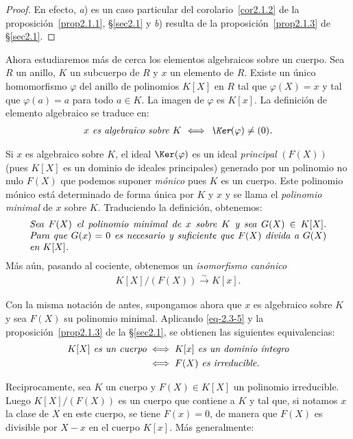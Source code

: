 \documentclass[oneside,bibtotoc,leqno,spanish]{amsbook}
\renewcommand{\to}[1][]{\xrightarrow{#1}}
\numberwithin{equation}{section}
\theoremstyle{defi}
\theoremstyle{note}
\theoremstyle{rem}
\numberwithin{theorem}{section}
\numberwithin{proposition}{section}
\numberwithin{definition}{section}
\numberwithin{lemma}{section}
\numberwithin{corollary}{section}
\numberwithin{example}{section}
\numberwithin{footnote}{section}%
\begin{document}
\begin{proof}
En efecto, {\itshape a}) es un caso particular del corolario~\ref{cor2.1.2} de la proposici\'on~\ref{prop2.1.1}, \S\ref{sec2.1}
y {\itshape b}) resulta de la proposici\'on~\ref{prop2.1.3} de \S\ref{sec2.1}.
\end{proof}

Ahora estudiaremos m\'as de cerca los elementos algebraicos sobre un cuerpo. Sea $R$ un anillo, $K$ un subcuerpo
de $R$ y $x$ un elemento de $R$. Existe un \'unico homomorfismo $\varphi$ del anillo de polinomios $K[X]$ en
$R$ tal que $\varphi(X) = x$ y tal que $\varphi(a) = a$ para todo $a\in K$. La imagen de $\varphi$ es $K[x]$.
La definici\'on de elemento algebraico se traduce en:
\begin{gather}\label{eq-2.3-4}
\text{\itshape $x$ es algebraico sobre $K$ $\iff$ $\Ker(\varphi)\neq(0)$.}
\end{gather}

Si $x$ es algebraico sobre $K$, el ideal $\Ker(\varphi)$ es un ideal {\em principal} $(F(X))$
(pues $K[X]$ es un dominio de ideales principales) generado por un polinomio no nulo $F(X)$ que podemos
suponer {\em m\'onico} pues $K$ es un cuerpo. Este polinomio m\'onico est\'a determinado de forma \'unica por
$K$ y $x$ y se llama el {\em polinomio minimal} de $x$ sobre $K$. Traduciendo la definici\'on, obtenemos:
\begin{gather}\label{eq-2.3-5}
\text{\parbox{0.9\textwidth}{\itshape Sea $F(X)$ el polinomio minimal de $x$ sobre $K$ y sea $G(X)\in K[X]$. Para que
$G(x) = 0$ es necesario y suficiente que $F(X)$ divida a $G(X)$ en $K[X]$.}}
\end{gather}
M\'as a\'un, pasando al cociente, obtenemos un {\em isomorfismo can\'onico}
\begin{gather}\label{eq-2.3-6}
K[X]/(F(X))\to[\sim] K[x].
\end{gather}

Con la misma notaci\'on de antes, supongamos ahora que $x$ es algebraico sobre $K$ y sea $F(X)$ su polinomio
minimal. Aplicando \eqref{eq-2.3-5} y la proposici\'on~\ref{prop2.1.3} de la \S\ref{sec2.1}, se obtienen las siguientes equivalencias:
\begin{align}
\text{\itshape $K[X]$ es un cuerpo} &\iff \text{\itshape $K[x]$ es un dominio \'integro}\\
&\iff \text{\itshape $F(X)$ es irreducible.}\notag
\end{align}

Reciprocamente, sea $K$ un cuerpo y $F(X)\in K[X]$ un polinomio irreducible. Luego $K[X]/(F(X))$ es un cuerpo
que contiene a $K$ y tal que, si notamos $x$ la clase de $X$ en este cuerpo, se tiene $F(x) = 0$, de manera que
$F(X)$ es divisible por $X-x$ en el cuerpo $K[x]$. M\'as generalmente:
\end{document}
